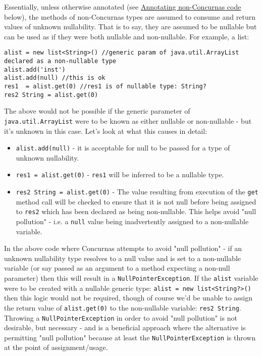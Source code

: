 \documentclass[conc-doc]{subfiles}
\begin{document}
Essentially, unless otherwise annotated (see \hyperref[subsubsec:annotatenonconc]{Annotating non-Concurnas code} below), the methods of non-Concurnas types are assumed to consume and return values of unknown nullability. That is to say, they are assumed to be nullable but can be used as if they were both nullable and non-nullable. For example, a list:

\begin{lstlisting}
alist = new list<String>() //generic param of java.util.ArrayList declared as a non-nullable type
alist.add('inst')
alist.add(null) //this is ok
res1  = alist.get(0) //res1 is of nullable type: String?
res2 String = alist.get(0)
\end{lstlisting}

The above would not be possible if the generic parameter of \lstinline{java.util.ArrayList} were to be known as either nullable or non-nullable - but it's unknown in this case. Let's look at what this causes in detail:

\begin{itemize}
	\item \lstinline{alist.add(null)} - it is acceptable for null to be passed for a type of unknown nullability.
	\item \lstinline{res1 = alist.get(0)} - \lstinline{res1} will be inferred to be a nullable type.
	\item \lstinline{res2 String = alist.get(0)} - The value resulting from execution of the \lstinline{get} method call will be checked to ensure that it is not null before being assigned to \lstinline{res2} which has been declared as being non-nullable. This helps avoid "null pollution" - i.e. a \lstinline{null} value being inadvertently assigned to a non-nullable variable.
\end{itemize}

In the above code where Concurnas attempts to avoid "null pollution" - if an unknown nullability type resolves to a null value and is set to a non-nullable variable (or say passed as an argument to a method expecting a non-null parameter) then this will result in a \lstinline{NullPointerException}. If the \lstinline{alist} variable were to be created with a nullable generic type: \lstinline{alist = new list<String?>()} then this logic would not be required, though of course we'd be unable to assign the return value of \lstinline{alist.get(0)} to the non-nullable variable: \lstinline{res2 String}. Throwing a \lstinline{NullPointerException} in order to avoid "null pollution" is not desirable, but necessary - and is a beneficial approach where the alternative is permitting "null pollution" because at least the \lstinline{NullPointerException} is thrown at the point of assignment/usage.
\end{document}

